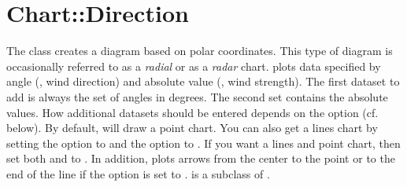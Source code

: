 %
%
\renewcommand{\thisname}{Chart::Direction}
\section{\thisname}
\name{\thisname}
\begin{Description}
The class \thisclass creates a diagram based on polar
coordinates. This type of diagram is occasionally referred to as a
\emph{radial} or as a \emph{radar} chart. \thisclass plots data
specified by angle (\eg, wind direction) and absolute value (\eg, wind
strength). The first dataset to add is always the set of angles in
degrees. The second set contains the absolute values. How additional
datasets should be entered depends on the option  (cf.
below). By default, \thisclass will draw a point chart. You can also
get a lines chart by setting the option  to
 and the option  to . If you
want a lines and point chart, then set both  and
 to . In addition, \thisclass plots arrows
from the center to the point or to the end of the line if the option
 is set to . \thisclass is a subclass of
.
\end{Description}

